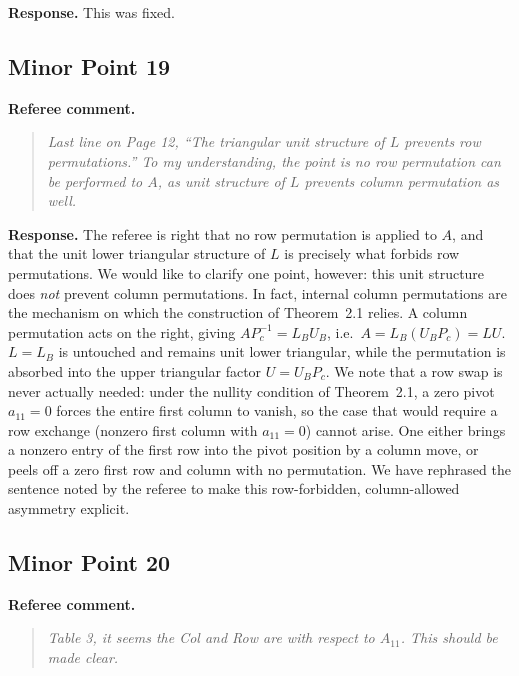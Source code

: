 \documentclass[11pt]{article}
\newenvironment{refereecomment}
{\par\smallskip\noindent\textbf{\color{commentblue}Referee comment.}
\begin{quote}\itshape}
  {
\end{quote}}
\newenvironment{authorresponse}
{\par\smallskip\noindent\textbf{\color{responsegreen}Response.}}
{\par\smallskip}
\begin{document}
\begin{authorresponse}
  This was fixed.
\end{authorresponse}

\subsection*{Minor Point 19}

\begin{refereecomment}
  Last line on Page 12, “The triangular unit structure of $L$ prevents row permutations.” To my understanding, the point is no row permutation can be performed to $A$, as unit structure of $L$ prevents column permutation as well.
\end{refereecomment}

\begin{authorresponse}
  The referee is right that no row permutation is applied to $A$, and that the unit lower triangular structure of $L$ is precisely what forbids row permutations. We would like to clarify one point, however: this unit structure does \emph{not} prevent column permutations. In fact, internal column permutations are the mechanism on which the construction of Theorem~2.1 relies. A column permutation acts on the right, giving $A P_c^{-1} = L_B U_B$, i.e.\ $A = L_B (U_B P_c) = L U$. $L = L_B$ is untouched and remains unit lower triangular, while the permutation is absorbed into the upper triangular factor $U = U_B P_c$. We note that a row swap is never actually needed: under the nullity condition of Theorem~2.1, a zero pivot $a_{11}=0$ forces the entire first column to vanish, so the case that would require a row exchange (nonzero first column with $a_{11}=0$) cannot arise. One either brings a nonzero entry of the first row into the pivot position by a column move, or peels off a zero first row and column with no permutation. We have rephrased the sentence noted by the referee to make this row-forbidden, column-allowed asymmetry explicit.
\end{authorresponse}

\subsection*{Minor Point 20}

\begin{refereecomment}
  Table 3, it seems the Col and Row are with respect to $A_{11}$. This should be made clear.
\end{refereecomment}
\end{document}
